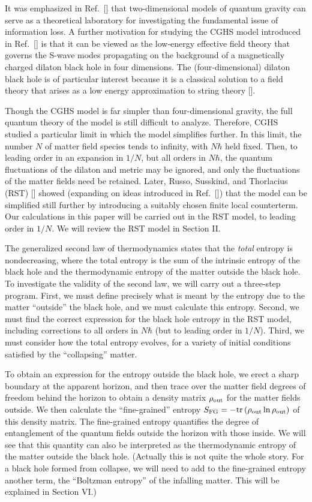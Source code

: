 It was emphasized in Ref.~[\cite{CGHS}] that two-dimensional models of quantum
gravity can serve as a theoretical laboratory for investigating the fundamental
issue of information loss.  A further motivation for studying the CGHS model
introduced in Ref.~[\cite{CGHS}] is that it can be viewed as the low-energy
effective field theory that governs the S-wave modes propagating on the
background of a magnetically charged dilaton black hole in four dimensions.
The (four-dimensional) dilaton black hole is of particular interest because it
is a classical solution to a field theory that arises as a low energy
approximation to string theory [\cite{gibbons}].

Though the CGHS model is far simpler than four-dimensional gravity, the full
quantum theory of the model is still difficult to analyze.  Therefore, CGHS
studied a particular limit in which the model simplifies further.  In this
limit, the number $N$ of matter field species tends to infinity, with $N\hbar$
held fixed.  Then, to leading order in an expansion in $1/N$, but all orders in
$N\hbar$, the quantum fluctuations of the dilaton and metric may be ignored,
and only the fluctuations of the matter fields need be retained.  Later, Russo,
Susskind, and Thorlacius (RST) [\cite{rst}] showed (expanding on ideas
introduced in Ref.~[\cite{emod}]) that the model can be simplified still
further by introducing a suitably chosen finite local counterterm.  Our
calculations in this paper will be carried out in the RST model, to leading
order in $1/N$.  We will review the RST model in Section II.

The generalized second law of thermodynamics states that the {\it total}
entropy is nondecreasing, where the total entropy is the sum of the intrinsic
entropy of the black hole and the thermodynamic entropy of the matter outside
the black hole.  To investigate the validity of the second law, we will carry
out a three-step program.  First, we must define precisely what is meant by the
entropy due to the matter ``outside'' the black hole, and we must calculate
this entropy.  Second, we must find the correct expression for the black hole
entropy in the RST model, including corrections to all orders in $N\hbar$ (but
to leading order in $1/N$).  Third, we must consider how the total entropy
evolves, for a variety of initial conditions satisfied by the ``collapsing''
matter.

To obtain an expression for the entropy outside the black hole, we erect a
sharp boundary at the apparent horizon, and then trace over the matter field
degrees of freedom behind the horizon to obtain a density matrix $\rho_{\rm
out}$ for the matter fields outside.  We then calculate the ``fine-grained''
entropy
$S_{\rm FG}=-{\rm tr}\left(\rho_{\rm out}\ln \rho_{\rm out}\right)$ of this
density matrix.  The fine-grained entropy quantifies the degree of entanglement
of the quantum fields outside the horizon with those inside.  We will see that
this quantity can also be interpreted as the thermodynamic entropy of the
matter outside the black hole.  (Actually this is not quite the whole story.
For a black hole formed from collapse, we will need to add to the fine-grained
entropy another term, the ``Boltzman entropy'' of the infalling matter.  This
will be explained in Section VI.)

